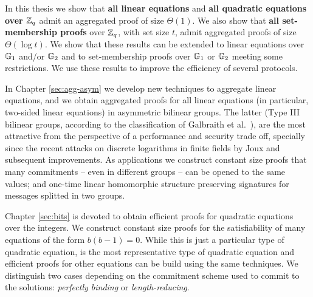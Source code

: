 In this thesis we show that \textbf{all linear equations} and \textbf{all quadratic equations over $\mathbb{Z}_q$} admit an aggregated proof of size $\Theta(1)$. We also show that \textbf{all set-membership proofs} over $\mathbb{Z}_q$, with set size $t$, admit aggregated proofs of size $\Theta(\log t)$. We show that these results can be extended to linear equations over $\mathbb{G}_1$ and/or $\mathbb{G}_2$ and to set-membership proofs over $\mathbb{G}_1$ or $\mathbb{G}_2$ meeting some restrictions. We use these results to improve the efficiency of several protocols. 
 


In Chapter \ref{sec:agg-asym} we develop new techniques to aggregate linear equations, and we obtain aggregated proofs for all linear equations (in particular, two-sided linear equations) in asymmetric bilinear groups. The latter (Type III bilinear groups, according to the classification of Galbraith et al.~\cite{DAM:GalPatSma08}), are the most 
attractive 
from the perspective of a performance and security trade off, specially since the recent attacks on discrete logarithms in finite fields by Joux \cite{SAC:Joux13} and subsequent improvements. As applications we construct constant size proofs that many commitments -- even in different groups -- can be opened to the same values; and one-time linear homomorphic structure preserving signatures for messages splitted in two groups.

Chapter \ref{sec:bits} is devoted to obtain efficient proofs for quadratic equations over the integers. We construct constant size proofs for the satisfiability of many equations of the form $b(b-1)=0$. While this is just a particular type of quadratic equation, is the most representative type of quadratic equation and efficient proofs for other equations can be build using the same techniques. We distinguish two cases depending on the commitment scheme used to commit to the solutions: \emph{perfectly binding} or \emph{length-reducing}. 

